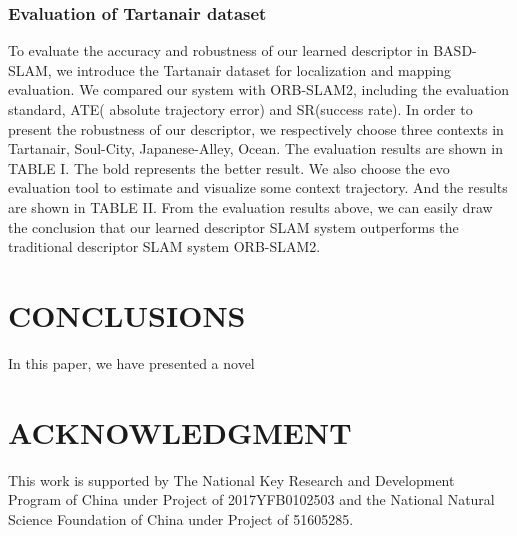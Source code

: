 \documentclass[letterpaper, 10 pt, conference]{ieeeconf}  %
\begin{document}
\subsubsection{Evaluation of Tartanair dataset}
To evaluate the accuracy and robustness of our learned descriptor in BASD-SLAM, we introduce the Tartanair dataset for localization and mapping evaluation. We compared our system with ORB-SLAM2, including the evaluation standard, ATE( absolute trajectory error) and SR(success rate). In order to present the robustness of our descriptor, we respectively choose three contexts in Tartanair, Soul-City, Japanese-Alley, Ocean. The evaluation results are shown in TABLE I. The bold represents the better result. We also choose the evo evaluation tool to estimate and visualize some context trajectory. And the results are shown in TABLE II. From the evaluation results above, we can easily draw the conclusion that our learned descriptor SLAM system outperforms the traditional descriptor SLAM system ORB-SLAM2.


\section{CONCLUSIONS}

In this paper, we have presented a novel


\section*{ACKNOWLEDGMENT}

This work is supported by The National Key Research and Development Program of China under Project of 2017YFB0102503 and the National Natural Science Foundation of China under Project of 51605285.



\end{document}
